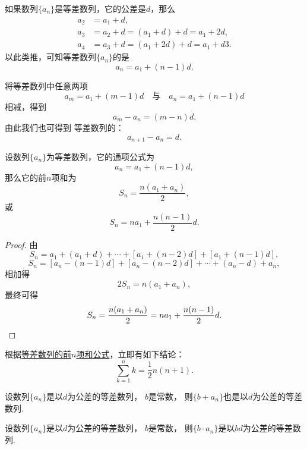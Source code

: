 如果数列\(\{a_n\}\)是等差数列，它的公差是\(d\)，那么\begin{align*}
    a_2 &= a_1 + d, \\
    a_3 &= a_2 + d = (a_1 + d) + d = a_1 + 2d, \\
    a_4 &= a_3 + d = (a_1 + 2d) + d = a_1 + d3.
\end{align*}
以此类推，可知等差数列\(\{a_n\}\)的是\begin{equation}
    a_n = a_1 + (n-1) d.
\end{equation}

将等差数列中任意两项\[
    a_m = a_1 + (m-1) d
    \quad\text{与}\quad
    a_n = a_1 + (n-1) d
\]相减，得到\[
    a_m - a_n = (m-n) d.
\]
由此我们也可得到%
等差数列的：\begin{equation}
    a_{n+1} - a_n = d.
\end{equation}

\begin{property}[等差数列求和]
设数列\(\{a_n\}\)为等差数列，它的通项公式为\[
    a_n = a_1 + (n-1) d,
\]
那么它的前\(n\)项和为\begin{equation}\label{equation:数列.等差数列的前n项和1}
    S_n = \frac{n(a_1 + a_n)}{2},
\end{equation}
或\begin{equation}\label{equation:数列.等差数列的前n项和2}
    S_n = n a_1 + \frac{n(n-1)}{2} d.
\end{equation}
\begin{proof}
由\[
    S_n = a_1 + (a_1 + d) + \dotsb + [a_1 + (n-2)d] + [a_1 + (n-1)d],
\]\[
    S_n = [a_n - (n-1)d] + [a_n - (n-2)d] + \dotsb + (a_n - d) + a_n,
\]相加得\[
    2 S_n = n(a_1 + a_n),
\]最终可得\[
    S_n = \frac{n(a_1 + a_n)}{2} = n a_1 + \frac{n(n-1)}{2} d.
    \qedhere
\]
\end{proof}
\end{property}

根据\hyperref[equation:数列.等差数列的前n项和1]{等差数列的前\(n\)项和公式}，立即有如下结论：
\begin{equation}
    \sum_{k=1}^n k = \frac{1}{2} n(n+1).
\end{equation}

\begin{property}
设数列\(\{a_n\}\)是以\(d\)为公差的等差数列，
\(b\)是常数，
则\(\{b + a_n\}\)也是以\(d\)为公差的等差数列.
\end{property}

\begin{property}
设数列\(\{a_n\}\)是以\(d\)为公差的等差数列，
\(b\)是常数，
则\(\{b \cdot a_n\}\)是以\(b d\)为公差的等差数列.
\end{property}

